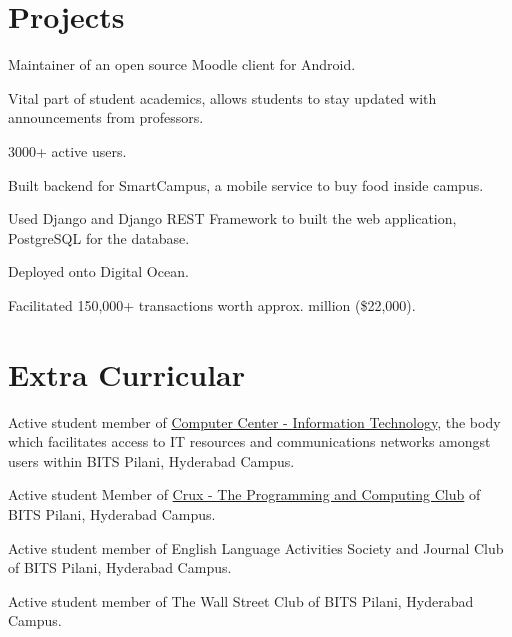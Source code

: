 \documentclass[]{abhijeet_viswa-deedy-resume-openfont}
\begin{document}
\begin{minipage}[t]{0.70\textwidth}
\section{Projects}
\begin{tightemize}
\item Maintainer of an open source Moodle client for Android.
\item Vital part of student academics, allows students to stay updated with announcements from professors.
\item 3000+ active users.
\end{tightemize}
\subsectionsep

\begin{tightemize}
 \item Built backend for SmartCampus, a mobile service to buy food inside campus.
 \item Used Django and Django REST Framework to built the web application, PostgreSQL for the database.
 \item Deployed onto Digital Ocean.
 \item Facilitated 150,000+ transactions worth approx. million (\$22,000).
\end{tightemize}
\primarysectionsep  %

\subsectionsep %
\section{Extra Curricular}
\vspace{\itemsep}
\begin{tightemize}
\item Active student member of \href{https://universe.bits-pilani.ac.in/Hyderabad/Computercentre}{Computer Center - Information Technology},
the body which facilitates access to IT resources and communications networks amongst users within BITS Pilani, Hyderabad Campus.
\item Active student Member of \href{https://crux-bphc.github.io}{Crux - The Programming and Computing Club} of BITS Pilani, Hyderabad Campus.
\item Active student member of English Language Activities Society and Journal Club of BITS Pilani, Hyderabad Campus.
\item Active student member of The Wall Street Club of BITS Pilani, Hyderabad Campus.
\end{tightemize}
\end{minipage}
\end{document}

